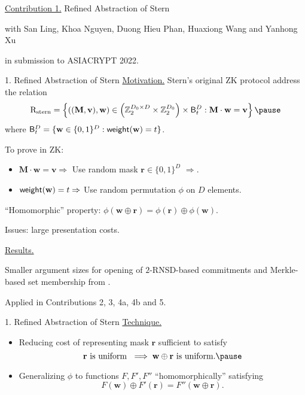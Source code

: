 \begin{frame}{}
	\underline{Contribution 1.} Refined Abstraction of Stern
	
	{\small with San Ling, Khoa Nguyen, Duong Hieu Phan, Huaxiong Wang and Yanhong Xu}
	
	in submission to ASIACRYPT 2022.
\end{frame}

\begin{frame}{1. Refined Abstraction of Stern}
	\underline{Motivation.} Stern's original ZK protocol address the relation \pause
	\begin{equation*}
		\RelationStern = \left\{((\mathbf{M},\mathbf{v}), \mathbf{w}) \in \left(\mathbb{Z}_2^{D_0\times D}\times \mathbb{Z}_2^{D_0}\right)\times \FixedWeightSet^D_t : \mathbf{M}\cdot\mathbf{w} = \mathbf{v}\right\}\pause
	\end{equation*}
	where $\mathsf{B}^D_t = \{\mathbf{w} \in \{0,1\}^D : \mathsf{weight}(\mathbf{w}) = t\}$.\pause
	
	To prove in ZK:\pause
	\begin{itemize}
			\item $\mathbf{M}\cdot\mathbf{w} =\mathbf{v} \Rightarrow$ Use random mask $\mathbf{r} \in \{0,1\}^D$ $\Rightarrow$.\pause
			\item $\mathsf{weight}(\mathbf{w}) = t \Rightarrow$ Use random permutation $\phi$ on $D$ elements.\pause
	\end{itemize}
	
	``Homomorphic'' property: $\phi(\mathbf{w} \oplus \mathbf{r}) = \phi(\mathbf{r}) \oplus \phi(\mathbf{w})$.\pause
	
	Issues: large presentation costs.\pause
	
	\underline{Results.}\pause
	
	Smaller argument sizes for opening of $2$-RNSD-based commitments and Merkle-based set membership from \cite{NguyenTWZ19}.\pause
	
	Applied in Contributions 2, 3, 4a, 4b and 5.
\end{frame}

\begin{frame}{1. Refined Abstraction of Stern}
	\underline{Technique.}\pause
	\begin{itemize}
		\item Reducing cost of representing mask $\mathbf{r}$ sufficient to satisfy \pause
		\begin{equation*}
			\mathbf{r} \text{ is uniform } \implies \mathbf{w} \oplus \mathbf{r} \text{ is uniform.}\pause
		\end{equation*}  
		\item Generalizing $\phi$ to functions $F, F', F''$ ``homomorphically'' satisfying\pause
		\begin{equation*}
			F(\mathbf{w}) \oplus F'(\mathbf{r}) = F''(\mathbf{w} \oplus \mathbf{r}).
		\end{equation*}
	\end{itemize}
\end{frame}
